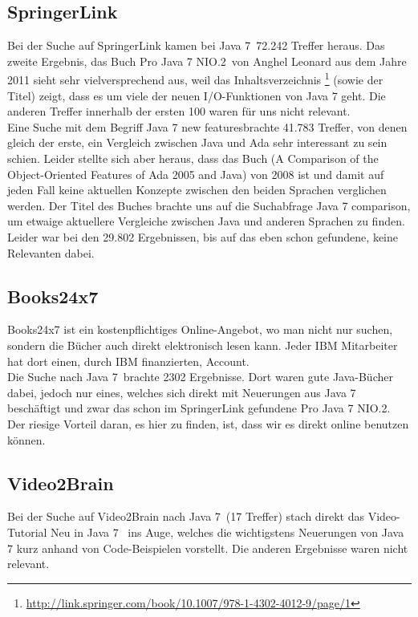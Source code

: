 \subsection{SpringerLink}
Bei der Suche auf SpringerLink kamen bei \glqq Java 7\grqq~72.242 Treffer heraus. Das zweite Ergebnis, das Buch \glqq Pro Java 7
NIO.2\grqq\cite{proJava7}~von Anghel Leonard aus dem Jahre 2011 sieht sehr vielversprechend aus, weil das Inhaltsverzeichnis
\footnote{\url{http://link.springer.com/book/10.1007/978-1-4302-4012-9/page/1}} (sowie der Titel) zeigt, dass es um viele der neuen
I/O-Funktionen von Java 7 geht.
Die anderen Treffer innerhalb der ersten 100 waren für uns nicht relevant.\\

Eine Suche mit dem Begriff \glqq Java 7 new features\grqq brachte 41.783 Treffer, von denen gleich der erste, ein Vergleich zwischen
Java und Ada sehr interessant zu sein schien. Leider stellte sich aber heraus, dass das Buch 
(\glqq A Comparison of the Object-Oriented Features of Ada 2005 and Java\grqq\cite{adacomparison}) von 2008 ist 
und damit auf jeden Fall keine aktuellen Konzepte zwischen den beiden Sprachen verglichen werden.
Der Titel des Buches brachte uns auf die Suchabfrage \glqq Java 7 comparison\grqq, um etwaige aktuellere Vergleiche zwischen
Java und anderen Sprachen zu finden. Leider war bei den 29.802 Ergebnissen, bis auf das eben schon gefundene, keine Relevanten
dabei.

\subsection{Books24x7}
Books24x7 ist ein kostenpflichtiges Online-Angebot, wo man nicht nur suchen, sondern die Bücher auch direkt elektronisch lesen
kann. Jeder IBM Mitarbeiter hat dort einen, durch IBM finanzierten, Account.\\

Die Suche nach \glqq Java 7\grqq~brachte 2302 Ergebnisse. Dort waren gute Java-Bücher dabei, jedoch nur eines, welches sich direkt
mit Neuerungen aus Java 7 beschäftigt und zwar das schon im SpringerLink gefundene \glqq Pro Java 7 NIO.2\grqq\cite{proJava7}. Der
riesige Vorteil daran, es hier zu finden, ist, dass wir es direkt online benutzen können. 

\subsection{Video2Brain}
Bei der Suche auf Video2Brain nach \glqq Java 7\grqq~(17 Treffer) stach direkt das Video-Tutorial \glqq Neu in Java 7\grqq\cite{v2bJava7}~
ins Auge, welches die wichtigstens Neuerungen von Java 7 kurz anhand von Code-Beispielen vorstellt.
Die anderen Ergebnisse waren nicht relevant.
%




